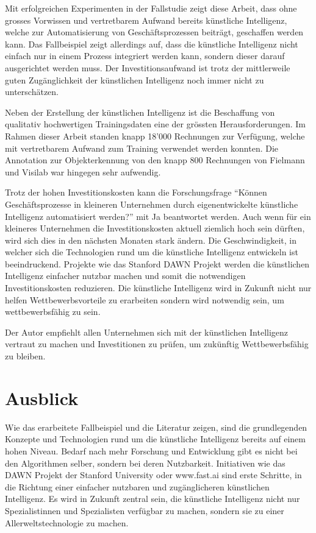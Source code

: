 Mit erfolgreichen Experimenten in der Fallstudie zeigt diese Arbeit, dass ohne grosses Vorwissen und vertretbarem Aufwand bereits künstliche Intelligenz, welche zur Automatisierung von Geschäftsprozessen beiträgt, geschaffen werden kann. Das Fallbeispiel zeigt allerdings auf, dass die künstliche Intelligenz nicht einfach nur in einem Prozess integriert werden kann, sondern dieser darauf ausgerichtet werden muss. Der Investitionsaufwand ist trotz der mittlerweile guten Zugänglichkeit der künstlichen Intelligenz noch immer nicht zu unterschätzen.

Neben der Erstellung der künstlichen Intelligenz ist die Beschaffung von qualitativ hochwertigen Trainingsdaten eine der grössten Herausforderungen. Im Rahmen dieser Arbeit standen knapp 18'000 Rechnungen zur Verfügung, welche mit vertretbarem Aufwand zum Training verwendet werden konnten. Die Annotation zur Objekterkennung von den knapp 800 Rechnungen von Fielmann und Visilab war hingegen sehr aufwendig. 

Trotz der hohen Investitionskosten kann die Forschungsfrage \enquote{Können Geschäftsprozesse in kleineren Unternehmen durch eigenentwickelte künstliche Intelligenz automatisiert werden?} mit Ja beantwortet werden. Auch wenn für ein kleineres Unternehmen die Investitionskosten aktuell ziemlich hoch sein dürften, wird sich dies in den nächsten Monaten stark ändern. Die Geschwindigkeit, in welcher sich die Technologien rund um die künstliche Intelligenz entwickeln ist beeindruckend. Projekte wie das Stanford DAWN Projekt werden die künstlichen Intelligenz einfacher nutzbar machen und somit die notwendigen Investitionskosten reduzieren. Die künstliche Intelligenz wird in Zukunft nicht nur helfen Wettbewerbsvorteile zu erarbeiten sondern wird notwendig sein, um wettbewerbsfähig zu sein.

Der Autor empfiehlt allen Unternehmen sich mit der künstlichen Intelligenz vertraut zu machen und Investitionen zu prüfen, um zukünftig Wettbewerbsfähig zu bleiben. 

\section{Ausblick}

Wie das erarbeitete Fallbeispiel und die Literatur zeigen, sind die grundlegenden Konzepte und Technologien rund um die künstliche Intelligenz bereits auf einem hohen Niveau. Bedarf nach mehr Forschung und Entwicklung gibt es nicht bei den Algorithmen selber, sondern bei deren Nutzbarkeit. Initiativen wie das DAWN Projekt der Stanford University oder www.fast.ai sind erste Schritte, in die Richtung einer einfacher nutzbaren und zugänglicheren künstlichen Intelligenz. Es wird in Zukunft zentral sein, die künstliche Intelligenz nicht nur Spezialistinnen und Spezialisten verfügbar zu machen, sondern sie zu einer Allerweltstechnologie zu machen. 

